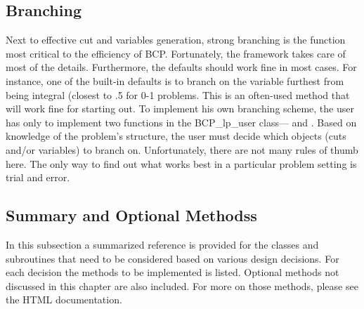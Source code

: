 \subsection{Branching}

Next to effective cut and variables generation, strong branching is
the function most critical to the efficiency of BCP. Fortunately, the
framework takes care of most of the details. Furthermore, the defaults
should work fine in most cases. For instance, one of the built-in
defaults is to branch on the variable furthest from being integral
(closest to .5 for 0-1 problems. This is an often-used method that
will work fine for starting out. To implement his own branching
scheme, the user has only to implement two functions in the
{BCP\_lp\_user} class--- and 
. Based on knowledge of the problem's
structure, the user must decide which objects (cuts and/or variables)
to branch on. Unfortunately, there are not many rules of thumb here.
The only way to find out what works best in a particular problem
setting is trial and error.

\subsection{Summary and Optional Methodss}

In this subsection a summarized reference is provided for the classes and
subroutines that need to be considered based on various design decisions. For
each decision the methods to be implemented is listed. Optional methods not
discussed in this chapter are also included. For more on those methods, please
see the HTML documentation.


